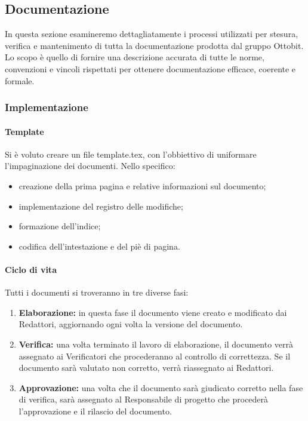 \documentclass[11pt,a4paper]{article}
\begin{document}
{	\subsection{Documentazione}
	In questa sezione esamineremo dettagliatamente i processi utilizzati per stesura, verifica e mantenimento di tutta la documentazione prodotta dal gruppo Ottobit.
	Lo scopo è quello di fornire una descrizione accurata di tutte le norme, convenzioni e vincoli rispettati per ottenere documentazione efficace, coerente e formale.
	\subsubsection{Implementazione}
	
	\paragraph{Template\\}
	Si è voluto creare un file template.tex, con l'obbiettivo di uniformare l'impaginazione dei documenti. 
	Nello specifico:
	\begin{itemize}
		\item{creazione della prima pagina e relative informazioni sul documento;}
		\item{implementazione del registro delle modifiche;}
		\item{formazione dell'indice;}
		\item {codifica dell'intestazione e del piè di pagina.}
		
	\end{itemize}
	
	\paragraph{Ciclo di vita\\}
	Tutti i documenti si troveranno in tre diverse fasi:
	\begin{enumerate}
		\item \textbf{Elaborazione:} in questa fase il documento viene creato e modificato dai Redattori, aggiornando ogni volta la versione del documento. 
		\item \textbf{Verifica:} una volta terminato il lavoro di elaborazione, il documento verrà assegnato ai Verificatori che procederanno al controllo di correttezza. Se il documento sarà valutato non corretto, verrà riassegnato ai Redattori.
		\item \textbf{Approvazione:} una volta che il documento sarà giudicato corretto nella fase di verifica, sarà assegnato al Responsabile di progetto che procederà l'approvazione e il rilascio del documento.
	\end{enumerate}
	
}
\end{document}
